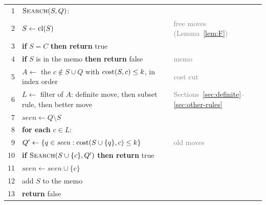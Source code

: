 \begin{algorithm}[t]
\caption{The customer search \citep{ChuStuckey2009} is a plain depth-first
search; all its pruning sits in the memo (lines~4 and~12), the filter
(line~6) and the old moves (line~9). It decides $\Sol_k(S)$ for a graph
$G=(C,E)$ and a stack bound $k$, and is called as
$\textsc{Search}(\emptyset,\emptyset)$. $Q$ is the set of old moves the node
inherits.}
\label{alg:search}
\small
\begin{tabular}{@{}r@{\quad}l@{\qquad}l@{}}
1 & $\textsc{Search}(S,Q)$: & \\
2 & \quad $S\gets\mathrm{cl}(S)$ & \textcolor{gray}{free moves (Lemma~\ref{lem:F})} \\
3 & \quad \textbf{if} $S=C$ \textbf{then return} true & \\
4 & \quad \textbf{if} $S$ is in the memo \textbf{then return} false & \textcolor{gray}{memo} \\
5 & \quad $A\gets$ the $c\notin S\cup Q$ with $\mathrm{cost}(S,c)\le k$, in index order & \textcolor{gray}{cost cut} \\
6 & \quad $L\gets$ filter of $A$: definite move, then subset rule, then better move & \textcolor{gray}{Sections~\ref{sec:definite}--\ref{sec:other-rules}} \\
7 & \quad $\mathit{seen}\gets Q\setminus S$ & \\
8 & \quad \textbf{for each} $c\in L$: & \\
9 & \quad\quad $Q'\gets\{q\in\mathit{seen} : \mathrm{cost}(S\cup\{q\},c)\le k\}$ & \textcolor{gray}{old moves} \\
10 & \quad\quad \textbf{if} $\textsc{Search}(S\cup\{c\},Q')$ \textbf{then return} true & \\
11 & \quad\quad $\mathit{seen}\gets\mathit{seen}\cup\{c\}$ & \\
12 & \quad add $S$ to the memo & \\
13 & \quad \textbf{return} false & \\
\end{tabular}
\end{algorithm}

